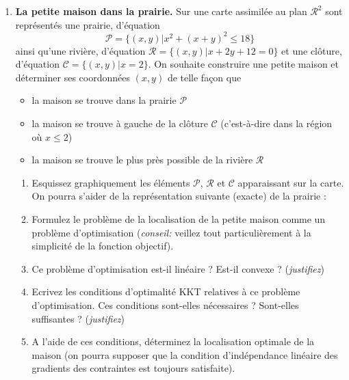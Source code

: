 \begin{enumerate}
  \item \textbf{La petite maison dans la prairie.} 
  Sur une carte assimilée au plan $\mathcal{R}^2$ 
  sont représentés une prairie, d'équation
  \[ \mathcal{P} = \{(x,y) | x^2 + (x+y)^2 \leq 18 \} \]
  ainsi qu'une rivière, d'équation $\mathcal{R} = \{(x,y) | x + 2y + 12 = 0\}$
  et une cl\^oture, d'équation $\mathcal{C}=\{(x,y) | x = 2\}$.
  On souhaite construire une petite maison et déterminer ses coordonnées $(x,y)$
  de telle façon que
  \begin{itemize}
    \item la maison se trouve dans la prairie $\mathcal{P}$
    \item la maison se trouve à gauche de la cl\^oture $\mathcal{C}$
    (c'est-à-dire dans la région où $x\leq 2$)
    \item la maison se trouve le plus près possible de la rivière $\mathcal{R}$
  \end{itemize}
  \begin{enumerate}
    \item Esquissez graphiquement 
    les éléments $\mathcal{P}$, $\mathcal{R}$ et $\mathcal{C}$
    apparaissant sur la carte.
    On pourra s'aider de la représentation suivante (exacte) de la prairie :
    \begin{center}
    \end{center}
    
    \item Formulez le problème de la localisation de la petite maison comme un 
    problème d'optimisation (\emph{conseil:} veillez tout particulièrement 
    à la simplicité de la fonction objectif).
    \item Ce problème d'optimisation est-il linéaire ? Est-il convexe ?
    (\emph{justifiez})
    \item Ecrivez les conditions d'optimalité KKT relatives 
    à ce problème d'optimisation.
    Ces conditions sont-elles nécessaires ? Sont-elles suffisantes ?
    (\emph{justifiez})
    \item A l'aide de ces conditions, déterminez la localisation 
    optimale de la maison (on pourra supposer que la condition d'indépendance
    linéaire des gradients des contraintes est toujours satisfaite).
  \end{enumerate}
  

\end{enumerate}
